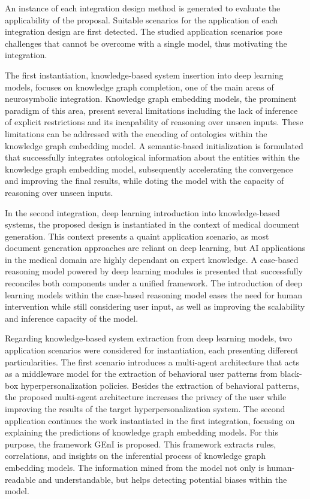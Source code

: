 
An instance of each integration design method is generated to evaluate the applicability of the proposal. Suitable scenarios for the application of each integration design are first detected. The studied application scenarios pose challenges that cannot be overcome with a single model, thus motivating the integration. 

The first instantiation, knowledge-based system insertion into deep learning models, focuses on knowledge graph completion, one of the main areas of neurosymbolic integration. Knowledge graph embedding models, the prominent paradigm of this area, present several limitations including the lack of inference of explicit restrictions and its incapability of reasoning over unseen inputs. These limitations can be addressed with the encoding of ontologies within the knowledge graph embedding model. A semantic-based initialization is formulated that successfully integrates ontological information about the entities within the knowledge graph embedding model, subsequently accelerating the convergence and improving the final results, while doting the model with the capacity of reasoning over unseen inputs.

In the second integration, deep learning introduction into knowledge-based systems, the proposed design is instantiated in the context of medical document generation. This context presents a quaint application scenario, as most document generation approaches are reliant on deep learning, but AI applications in the medical domain are highly dependant on expert knowledge. A case-based reasoning model powered by deep learning modules is presented that successfully reconciles both components under a unified framework. The introduction of deep learning models within the case-based reasoning model eases the need for human intervention while still considering user input, as well as improving the scalability and inference capacity of the model. 

Regarding knowledge-based system extraction from deep learning models, two application scenarios were considered for instantiation, each presenting different particularities. The first scenario introduces a multi-agent architecture that acts as a middleware model for the extraction of behavioral user patterns from black-box hyperpersonalization policies. Besides the extraction of behavioral patterns, the proposed multi-agent architecture increases the privacy of the user while improving the results of the target hyperpersonalization system. The second application continues the work instantiated in the first integration, focusing on explaining the predictions of knowledge graph embedding models. For this purpose, the framework GEnI is proposed. This framework extracts rules, correlations, and insights on the inferential process of knowledge graph embedding models. The information mined from the model not only is human-readable and understandable, but helps detecting potential biases within the model. 

